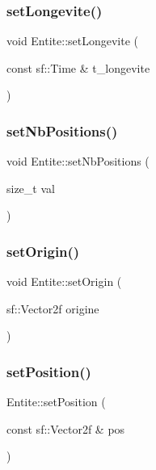 \mbox{\label{class_entite_a1bf4d7561c3aa7f60d5af962a5a7e920}} 
\subsubsection{\texorpdfstring{set\+Longevite()}{setLongevite()}}
{\footnotesize\ttfamily void Entite\+::set\+Longevite (\begin{DoxyParamCaption}\item[{const sf\+::\+Time \&}]{t\+\_\+longevite }\end{DoxyParamCaption})\hspace{0.3cm}{\ttfamily [inline]}}

\mbox{\label{class_entite_af36fc425e2043216b8519ab0c42f640b}} 
\subsubsection{\texorpdfstring{set\+Nb\+Positions()}{setNbPositions()}}
{\footnotesize\ttfamily void Entite\+::set\+Nb\+Positions (\begin{DoxyParamCaption}\item[{size\+\_\+t}]{val }\end{DoxyParamCaption})}

\mbox{\label{class_entite_a9c96cb18e7dafa69117d5573ab47de1e}} 
\subsubsection{\texorpdfstring{set\+Origin()}{setOrigin()}}
{\footnotesize\ttfamily void Entite\+::set\+Origin (\begin{DoxyParamCaption}\item[{sf\+::\+Vector2f}]{origine }\end{DoxyParamCaption})}

\mbox{\label{class_entite_aa7fe4a7ebd8eb4c80ef9fdb7d97f2dad}} 
\subsubsection{\texorpdfstring{set\+Position()}{setPosition()}}
{\footnotesize\ttfamily Entite\+::set\+Position (\begin{DoxyParamCaption}\item[{const sf\+::\+Vector2f \&}]{pos }\end{DoxyParamCaption})}



